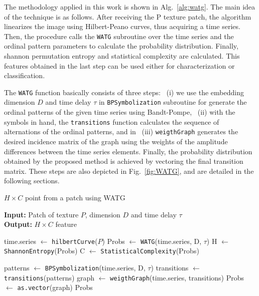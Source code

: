 \documentclass[journal]{IEEEtran}
\begin{document}
The methodology applied in this work is shown in Alg.~\ref{alg:watg}.
The main idea of the technique is as follows.
After receiving the P texture patch, the algorithm linearizes the image using Hilbert-Peano curves, thus acquiring a time series.
Then, the procedure calls the \texttt{WATG} subroutine over the time series and the ordinal pattern parameters to calculate the probability distribution.
Finally, shannon permutation entropy and statistical complexity are calculated.
This features obtained in the last step can be used either for characterization or classification.

The \texttt{WATG} function basically consists of three steps: ~(i) we use the embedding dimension $D$ and time delay $\tau$ in \texttt{BPSymbolization} subroutine for generate the ordinal patterns of the given time series using Bandt-Pompe, ~(ii) with the symbols in hand, the \texttt{transitions} function calculates the sequence of alternations of the ordinal patterns, and in ~(iii) \texttt{weigthGraph} generates the desired incidence matrix of the graph using the weights of the amplitude differences between the time series elements.
Finally, the probability distribution obtained by the proposed method is achieved by vectoring the final transition matrix.
These steps are also depicted in Fig.~\ref{fig:WATG}, and are detailed in the following sections.

\begin{algorithm}[h]
	\caption{$H \times C$ point from a patch using WATG}
	\label{alg:watg}                                
	\textbf{Input:} Patch of texture $P$, dimension $D$ and time delay \textbf{$\tau$}\\
	\textbf{Output:} $H \times C$ feature
	\begin{algorithmic}[1]
		\State time.series $\gets$ \texttt{hilbertCurve}($P$)
		\State Probs $\gets$ \texttt{WATG}(time.series, D, $\tau$)
		\State H $\gets$ \texttt{ShannonEntropy}(Probs)
		\State C $\gets$ \texttt{StatisticalComplexity}(Probs)
		
		\vspace{0.15cm}
		
		\State patterns $\gets$ \texttt{BPSymbolization}(time.series, D, $\tau$)
		\State transitions $\gets$ \texttt{transitions}(patterns)
		\State graph $\gets$ \texttt{weigthGraph}(time.series, transitions)
		\State Probs $\gets$ \texttt{as.vector}(graph)
		\State \Return Probs
		\EndFunction
	\end{algorithmic}
\end{algorithm}
\end{document}
